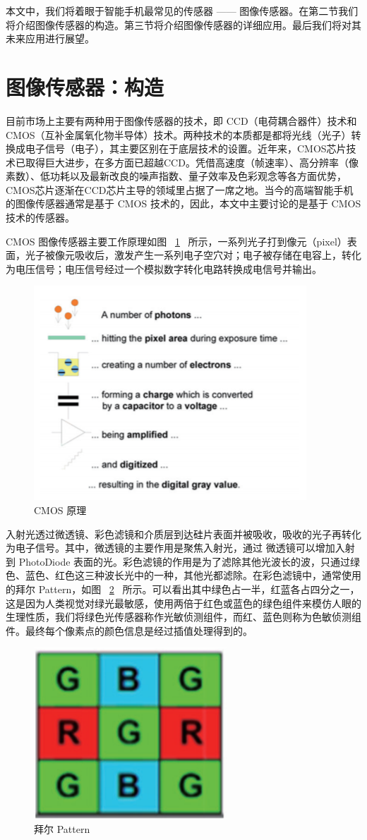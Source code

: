 \documentclass[lang=cn]{elegantpaper}
\begin{document}
本文中，我们将着眼于智能手机最常见的传感器 —— 图像传感器。在第二节我们将介绍图像传感器的构造。第三节将介绍图像传感器的详细应用。最后我们将对其未来应用进行展望。

\section{图像传感器：构造}

目前市场上主要有两种用于图像传感器的技术，即 CCD（电荷耦合器件）技术和CMOS（互补金属氧化物半导体）技术。两种技术的本质都是都将光线（光子）转换成电子信号（电子），其主要区别在于底层技术的设置。近年来，CMOS芯片技术已取得巨大进步，在多方面已超越CCD。凭借高速度（帧速率）、高分辨率（像素数）、低功耗以及最新改良的噪声指数、量子效率及色彩观念等各方面优势，CMOS芯片逐渐在CCD芯片主导的领域里占据了一席之地。当今的高端智能手机的图像传感器通常是基于 CMOS 技术的，因此，本文中主要讨论的是基于 CMOS 技术的传感器。

CMOS 图像传感器主要工作原理如图 ~\ref{fig:cmos}~ 所示，一系列光子打到像元（pixel）表面，光子被像元吸收后，激发产生一系列电子空穴对；电子被存储在电容上，转化为电压信号；电压信号经过一个模拟数字转化电路转换成电信号并输出。

\begin{figure}[H]
    \centering
    \includegraphics[width=.4\textwidth]{1-1.png}
    \caption{CMOS 原理}
    \label{fig:cmos}
\end{figure}

入射光透过微透镜、彩色滤镜和介质层到达硅片表面并被吸收，吸收的光子再转化为电子信号。其中，微透镜的主要作用是聚焦入射光，通过
微透镜可以增加入射到 PhotoDiode 表面的光。彩色滤镜的作用是为了滤除其他光波长的波，只通过绿色、蓝色、红色这三种波长光中的一种，其他光都滤除。在彩色滤镜中，通常使用的拜尔 Pattern，如图 ~\ref{fig:Pattern}~ 所示。可以看出其中绿色占一半，红蓝各占四分之一，这是因为人类视觉对绿光最敏感，使用两倍于红色或蓝色的绿色组件来模仿人眼的生理性质，我们将绿色光传感器称作光敏侦测组件，而红、蓝色则称为色敏侦测组件。最终每个像素点的颜色信息是经过插值处理得到的。

\begin{figure}[H]
    \centering
    \includegraphics[width=.4\textwidth]{1-2.png}
    \caption{拜尔 Pattern}
    \label{fig:Pattern}
\end{figure}
\end{document}
